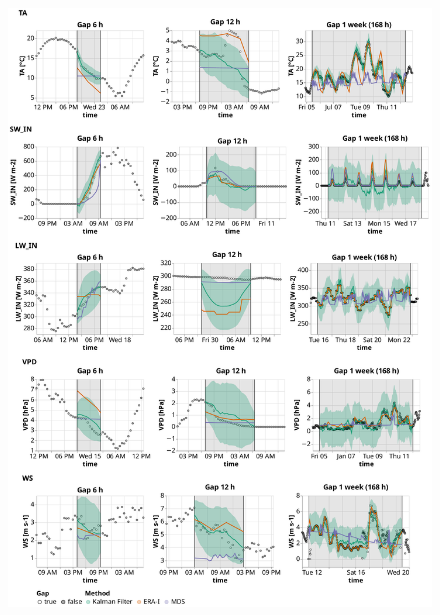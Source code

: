 \documentclass{article}
\begin{document}
\begin{figure}
\centerline{\includegraphics[width=5.7in]{timeseries_1_2}}
\caption{}
\label{fig:ts_3-1}
\end{figure}
\end{document}
